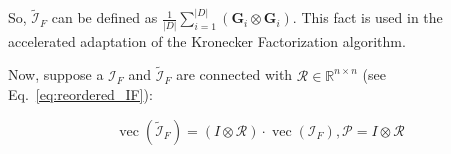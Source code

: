 \documentclass{article}
\DeclareMathOperator{\vect}{vec}
\begin{document}
So, $\tilde{\mathcal{I}}_F$ can be defined as $\frac{1}{|D|} \sum_{i=1}^{|D|}(\mathbf{G}_i \otimes \mathbf{G}_i)$. This fact is used in the accelerated adaptation of the Kronecker Factorization algorithm.

Now, suppose a $\mathcal{I}_F$ and $\tilde{\mathcal{I}}_F$ are connected with \( \mathcal{R} \in \mathbb{R}^{n \times n} \) (see Eq.~\ref{eq:reordered_IF}):


\begin{equation}
\operatorname{vec}(\widetilde{\mathcal{I}}_F) = (I \otimes \mathcal{R}) \cdot \operatorname{vec}(\mathcal{I}_F), \mathcal{P} = I \otimes \mathcal{R}
\end{equation}








\end{document}
